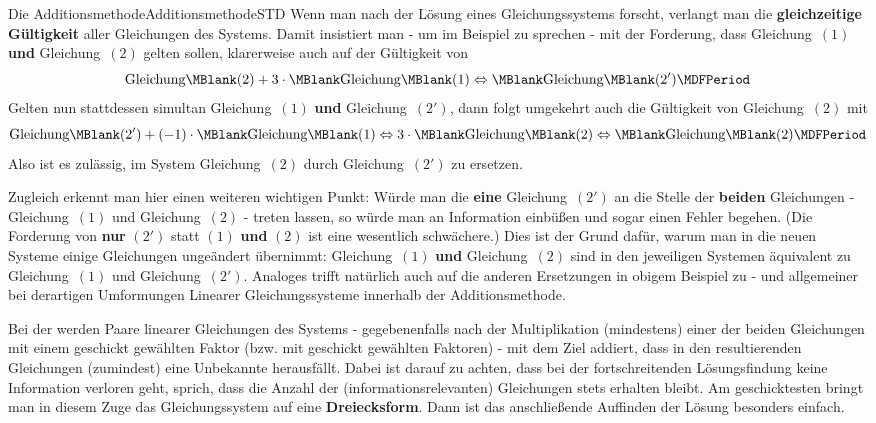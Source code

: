 \begin{MXContent}{Die Additionsmethode}{Additionsmethode}{STD}
Wenn man nach der Lösung eines Gleichungssystems forscht, verlangt man die \textbf{gleichzeitige Gül\-tig\-keit}
aller Gleichungen des Systems. Damit insistiert man - um im Beispiel  zu sprechen - mit
der Forderung, dass Gleichung~$(1)$ \textbf{und} Gleichung~$(2)$ gelten sollen, klarerweise auch auf der Gültigkeit von
$$\mbox{Gleichung}\MBlank (2) + 3 \cdot \MBlank\mbox{Gleichung}\MBlank (1) \Leftrightarrow \MBlank\mbox{Gleichung}\MBlank (2') \MDFPeriod $$
Gelten nun stattdessen simultan Gleichung~$(1)$ \textbf{und} Gleichung~$(2')$, 
dann folgt umgekehrt auch die Gültigkeit von Gleichung~$(2)$ mit
$$\mbox{Gleichung}\MBlank (2') + (-1) \cdot \MBlank\mbox{Gleichung}\MBlank (1) \Leftrightarrow 3\cdot\MBlank\mbox{Gleichung}\MBlank (2) \Leftrightarrow \MBlank\mbox{Gleichung}\MBlank (2) \MDFPeriod $$
Also ist es zulässig, im System Gleichung~$(2)$ durch Gleichung~$(2')$ zu ersetzen.

Zugleich erkennt man hier einen weiteren wichtigen Punkt: Würde man die \textbf{eine} Gleichung~$(2')$ an die
Stelle der \textbf{beiden} Gleichungen - Gleichung~$(1)$ und Gleichung~$(2)$ - treten lassen, so würde man an
Information einbüßen und sogar einen Fehler begehen. (Die Forderung von \textbf{nur} $(2')$ statt $(1)$ \textbf{und}
$(2)$ ist eine wesentlich schwächere.) Dies ist der Grund dafür, warum man in die \glqq neuen{\grqq} Systeme einige
Gleichungen ungeändert übernimmt: Gleichung~$(1)$ \textbf{und} Gleichung~$(2)$ sind in den jeweiligen Systemen äquivalent
zu Gleichung~$(1)$ und Gleichung~$(2')$. Analoges trifft natürlich auch auf die anderen Ersetzungen in obigem
Beispiel zu - und allgemeiner bei derartigen Umformungen Linearer Gleichungssysteme innerhalb der Additionsmethode.
\begin{MInfo}
Bei der  werden Paare linearer Gleichungen des Systems - gegebenenfalls
nach der Multiplikation (mindestens) einer der beiden Gleichungen mit einem geschickt gewählten Faktor (bzw. mit
geschickt gewählten Faktoren) - mit dem Ziel addiert, dass in den resultierenden Gleichungen (zumindest) eine Unbekannte
herausfällt. Dabei ist darauf zu achten, dass bei der fortschreitenden Lösungsfindung keine Information verloren geht,
sprich, dass die Anzahl der (informationsrelevanten) Gleichungen stets erhalten bleibt. Am geschicktesten bringt man
in diesem Zuge das Gleichungssystem auf eine \textbf{Dreiecksform}. Dann ist das anschließende Auffinden der Lösung
besonders einfach.
\end{MInfo}
\end{MXContent}

